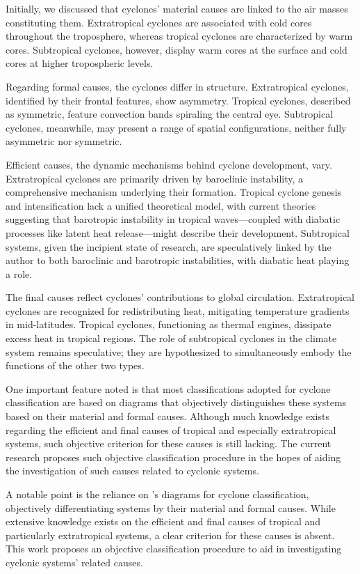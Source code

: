 Initially, we discussed that cyclones' material causes are linked to the air masses constituting them. Extratropical cyclones are associated with cold cores throughout the troposphere, whereas tropical cyclones are characterized by warm cores. Subtropical cyclones, however, display warm cores at the surface and cold cores at higher tropospheric levels.

Regarding formal causes, the cyclones differ in structure. Extratropical cyclones, identified by their frontal features, show asymmetry. Tropical cyclones, described as symmetric, feature convection bands spiraling the central eye. Subtropical cyclones, meanwhile, may present a range of spatial configurations, neither fully asymmetric nor symmetric.

Efficient causes, the dynamic mechanisms behind cyclone development, vary. Extratropical cyclones are primarily driven by baroclinic instability, a comprehensive mechanism underlying their formation. Tropical cyclone genesis and intensification lack a unified theoretical model, with current theories suggesting that barotropic instability in tropical waves—coupled with diabatic processes like latent heat release—might describe their development. Subtropical systems, given the incipient state of research, are speculatively linked by the author to both baroclinic and barotropic instabilities, with diabatic heat playing a role.

The final causes reflect cyclones' contributions to global circulation. Extratropical cyclones are recognized for redistributing heat, mitigating temperature gradients in mid-latitudes. Tropical cyclones, functioning as thermal engines, dissipate excess heat in tropical regions. The role of subtropical cyclones in the climate system remains speculative; they are hypothesized to simultaneously embody the functions of the other two types.

One important feature noted is that most classifications adopted for cyclone classification are based on \citet{hart2003cyclone} diagrams that objectively distinguishes these systems based on their material and formal causes. Although much knowledge exists regarding the efficient and final causes of tropical and especially extratropical systems, such objective criterion for these causes is still lacking. The current research proposes such objective classification procedure in the hopes of aiding the investigation of such causes related to cyclonic systems. 

A notable point is the reliance on \citet{hart2003cyclone}'s diagrams for cyclone classification, objectively differentiating systems by their material and formal causes. While extensive knowledge exists on the efficient and final causes of tropical and particularly extratropical systems, a clear criterion for these causes is absent. This work proposes an objective classification procedure to aid in investigating cyclonic systems' related causes.

